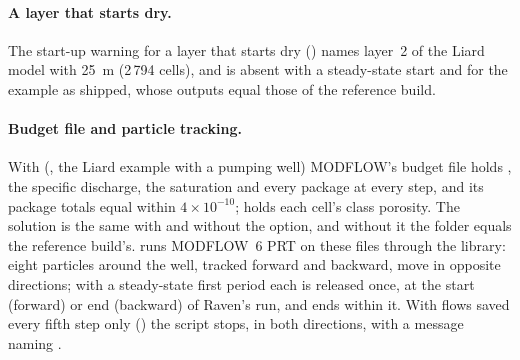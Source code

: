 \paragraph{A layer that starts dry.} The start-up warning for a layer that starts dry () names
layer~2 of the Liard model with  25~m (2\,794 cells), and is absent with a steady-state start
and for the example as shipped, whose outputs equal those of the reference build.

\paragraph{Budget file and particle tracking.} With  (, the Liard
example with a pumping well) MODFLOW's budget file holds , the specific discharge, the saturation and
every package at every step, and its package totals equal  within $4\times10^{-10}$; 
holds each cell's class porosity. The solution is the same with and without the option, and without it the 
folder equals the reference build's.  runs MODFLOW~6 PRT on these files through the library:
eight particles around the well, tracked forward and backward, move in opposite directions; with a steady-state first
period each is released once, at the start (forward) or end (backward) of Raven's run, and ends within it. With flows
saved every fifth step only () the script stops, in both directions, with a message naming
.

